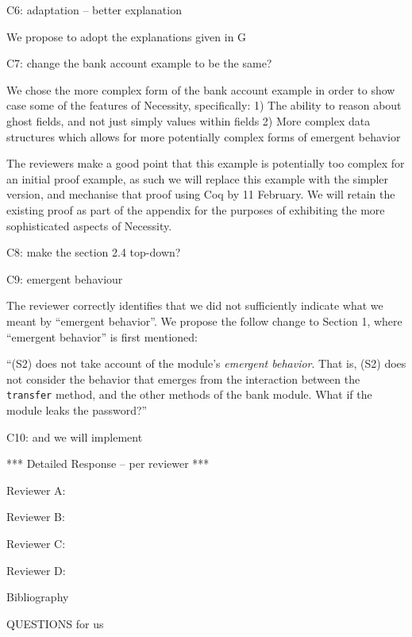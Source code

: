 C6: adaptation -- better explanation

We propose to adopt the explanations given in G

C7: change the bank account example to be the same?
 
 We chose the more complex form of the bank account example in order to show case some of the features of Necessity, specifically:
1) The ability to reason about ghost fields, and not just simply values within fields
2) More complex data structures which allows for more potentially complex forms of emergent behavior

The reviewers make a good point that this example is potentially too complex for an initial proof example, as such we will 
replace this example with the simpler version, and mechanise that proof using Coq by 11 February. We will retain the existing proof as part 
of the appendix for the purposes of exhibiting the more sophisticated aspects of Necessity.
 
C8: make the section 2.4 top-down?

C9: emergent behaviour 

 The reviewer correctly identifies that we did not sufficiently indicate what we meant by ``emergent behavior''. We propose the follow change 
to Section 1, where ``emergent behavior'' is first mentioned:

``(S2) does not take account of the module's \emph{emergent behavior}. That is, (S2) does not consider the behavior that emerges from the interaction between the 
\texttt{transfer} method, and the other methods of the bank module. What if the module leaks the password?''

 
C10: and we will implement
 


*** Detailed Response -- per reviewer ***

Reviewer A:

Reviewer B:

Reviewer C:

Reviewer D:

Bibliography



QUESTIONS for us